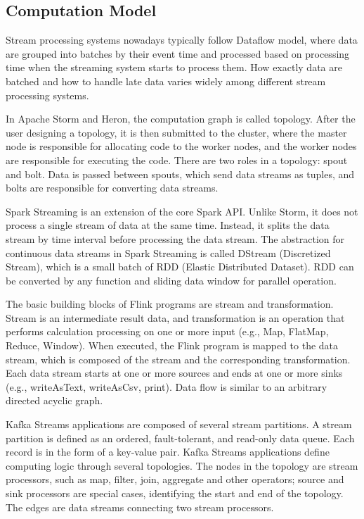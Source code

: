 \documentclass[pdftex,twocolumn,10pt,letterpaper]{article}
\begin{document}
\subsection{Computation Model}
Stream processing systems nowadays typically follow Dataflow model\cite{Dataflow}, where data are grouped into batches by their event time and processed based on processing time when the streaming system starts to process them. How exactly data are batched and how to handle late data varies widely among different stream processing systems. 

In Apache Storm and Heron, the computation graph is called topology. After the user designing a topology, it is then submitted to the cluster, where the master node is responsible for allocating code to the worker nodes, and the worker nodes are responsible for executing the code. There are two roles in a topology: spout and bolt. Data is passed between spouts, which send data streams as tuples, and bolts are responsible for converting data streams.

Spark Streaming is an extension of the core Spark API. Unlike Storm, it does not process a single stream of data at the same time. Instead, it splits the data stream by time interval before processing the data stream. The abstraction for continuous data streams in Spark Streaming is called DStream (Discretized Stream), which is a small batch of RDD (Elastic Distributed Dataset). RDD can be converted by any function and sliding data window for parallel operation.

The basic building blocks of Flink programs are stream and transformation. Stream is an intermediate result data, and transformation is an operation that performs calculation processing on one or more input (e.g., Map, FlatMap, Reduce, Window). When executed, the Flink program is mapped to the data stream, which is composed of the stream and the corresponding transformation. Each data stream starts at one or more sources and ends at one or more sinks (e.g., writeAsText, writeAsCsv, print). Data flow is similar to an arbitrary directed acyclic graph. 

Kafka Streams applications are composed of several stream partitions. A stream partition is defined as an ordered, fault-tolerant, and read-only data queue. Each record is in the form of a key-value pair. Kafka Streams applications define computing logic through several topologies. The nodes in the topology are stream processors, such as map, filter, join, aggregate and other operators; source and sink processors are special cases, identifying the start and end of the topology. The edges are data streams connecting two stream processors.
\end{document}
